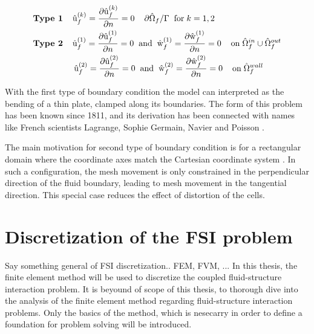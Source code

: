 \begin{align*}
&\textbf{Type 1} \hspace{4mm} \ha{u}_f^{(k)} = \pder{\ha{u}_f^{(k)}}{n} = 0 \hspace{4mm} \partial \hat{\Omega}_f / \Gamma \hspace{2mm} \text{for} \hspace{1mm} k = 1, 2 \\
&\textbf{Type 2} \hspace{4mm} \ha{u}_f^{(1)} = \pder{\ha{u}_f^{(1)}}{n} = 0 
\hspace{2mm} \text{and} \hspace{2mm} \ha{w}_f^{(1)} = \pder{\ha{w}_f^{(1)}}{n} = 0 \hspace{4mm} \text{on} \hspace{1mm} \hat{\Omega}_f^{in} \cup \hat{\Omega}_f^{out} \\ 
&\hspace{17mm}  \ha{u}_f^{(2)} = \pder{\ha{u}_f^{(2)}}{n} = 0 
\hspace{2mm} \text{and} \hspace{2mm} \ha{w}_f^{(2)} = \pder{\ha{w}_f^{(2)}}{n} = 0 \hspace{4mm} \text{on} \hspace{1mm}  \hat{\Omega}_f^{wall}
\end{align*}

With the first type of boundary condition the model can interpreted as the bending of a thin plate, clamped along its boundaries. The form of this problem has been known since 1811, and its derivation has been connected with names like  French scientists Lagrange, Sophie Germain, Navier and Poisson \cite{Meleshko1997}.  

The main motivation for second type of boundary condition is for a rectangular domain where the coordinate axes match the Cartesian coordinate system \cite{Wicka}. In such a configuration, the mesh movement is only constrained in the perpendicular direction of the fluid boundary, leading to mesh movement in the tangential direction. This special case reduces the effect of distortion of the cells.  

\newpage

\newpage
\section{Discretization of the FSI problem}
Say something general of FSI discretization.. FEM, FVM, ...
In this thesis, the finite element method will be used to discretize the coupled fluid-structure interaction problem. It is beyound of scope  of this thesis, to thorough dive into the analysis of the finite element method regarding fluid-structure interaction problems. Only the basics of the method, which is nesecarry in order to define a foundation for problem solving will be introduced. 

